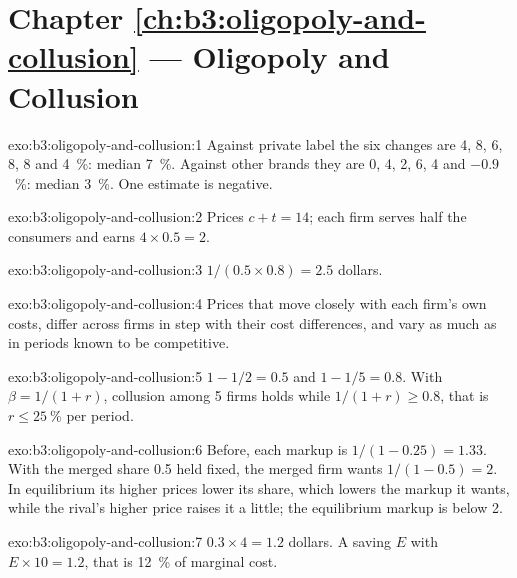 \section*{Chapter \ref{ch:b3:oligopoly-and-collusion} --- Oligopoly and Collusion}

\begin{solution}{exo:b3:oligopoly-and-collusion:1}
Against private label the six changes are 4, 8, 6, 8, 8 and 4~\%: median 7~\%. Against other brands they
are 0, 4, 2, 6, 4 and $-0.9$~\%: median 3~\%. One estimate is negative. %
\end{solution}

\begin{solution}{exo:b3:oligopoly-and-collusion:2}
Prices $c + t = 14$; each firm serves half the consumers and earns $4 \times 0.5 = 2$.
\end{solution}

\begin{solution}{exo:b3:oligopoly-and-collusion:3}
$1/(0.5 \times 0.8) = 2.5$ dollars.
\end{solution}

\begin{solution}{exo:b3:oligopoly-and-collusion:4}
Prices that move closely with each firm's own costs, differ across firms in step
with their cost differences, and vary as much as in periods known to be competitive.
\end{solution}

\begin{solution}{exo:b3:oligopoly-and-collusion:5}
$1 - 1/2 = 0.5$ and $1 - 1/5 = 0.8$. With $\beta = 1/(1 + r)$, collusion among 5 firms holds while $1/(1 + r) \ge 0.8$, that is
$r \le 25~\%$ per period.
\end{solution}

\begin{solution}{exo:b3:oligopoly-and-collusion:6}
Before, each markup is $1/(1 - 0.25) = 1.33$. With the merged share 0.5 held fixed, the merged firm wants
$1/(1 - 0.5) = 2$. In equilibrium its higher prices lower its share, which lowers the markup
it wants, while the rival's higher price raises it a little; the equilibrium markup is
below 2.
\end{solution}

\begin{solution}{exo:b3:oligopoly-and-collusion:7}
$0.3 \times 4 = 1.2$ dollars. A saving $E$ with $E \times 10 = 1.2$, that is 12~\% of marginal cost.
\end{solution}

